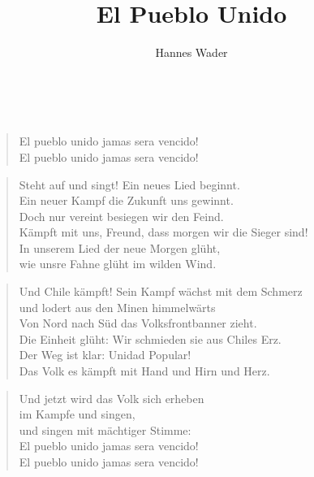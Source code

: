 \documentclass[9pt,a4paper,oneside, onecolumn]{article}
\author{Hannes Wader}
\title{El Pueblo Unido}
\date{}
\begin{document}
\maketitle
\thispagestyle{empty}

\mbox{
}\\


\begin{verse}
El pueblo unido jamas sera vencido!\\
El pueblo unido jamas sera vencido!\\
\end{verse}

\begin{verse}
 Steht auf und singt! Ein neues Lied beginnt.\\
 Ein neuer Kampf die Zukunft uns gewinnt.\\
   Doch nur vereint besiegen wir den Feind.\\
   Kämpft mit uns, Freund, dass morgen wir die Sieger sind!\\
   In unserem Lied der neue Morgen glüht,\\
   wie unsre Fahne glüht im wilden Wind.\\
\end{verse}

\begin{verse}
 Und Chile kämpft! Sein Kampf wächst mit dem Schmerz\\
 und lodert aus den Minen himmelwärts\\
   Von Nord nach Süd das Volksfrontbanner zieht.\\
   Die Einheit glüht: Wir schmieden sie aus Chiles Erz.\\
   Der Weg ist klar: Unidad Popular!\\
   Das Volk es kämpft mit Hand und Hirn und Herz.\\
\end{verse}

\begin{verse}

Und jetzt wird das Volk sich erheben\\
im Kampfe und singen,\\
und singen mit mächtiger Stimme:\\

El pueblo unido jamas sera vencido!\\
El pueblo unido jamas sera vencido!\\
\end{verse}
\end{document}
